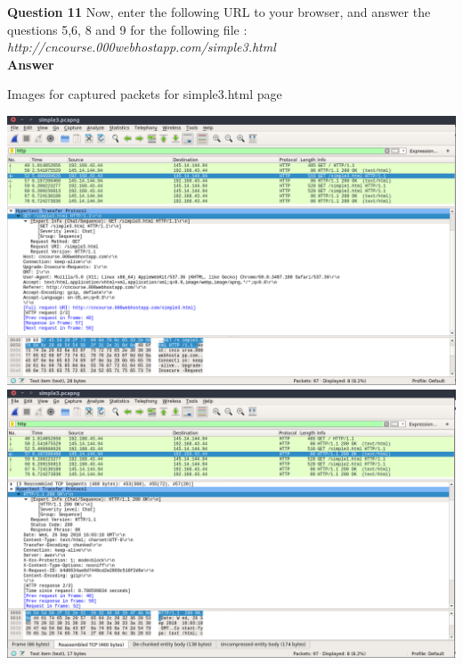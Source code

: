 \documentclass[14pt]{extarticle}
\begin{document}
    \noindent
    \textbf{\large Question 11}
    Now, enter the following URL to your browser, and 
    answer the questions 5,6, 8 and 9 for the following file :
    \textsl{http://cncourse.000webhostapp.com/simple3.html}\\
    \textbf{\large Answer}
    \begin{center}
        {\large \textmd{Images for captured packets for simple3.html page}}\\
    \end{center}
    \includegraphics[scale=0.40]{1_11_1}\\[10pt]
    \includegraphics[scale=0.40]{1_11_2}\\[10pt]
\end{document}
